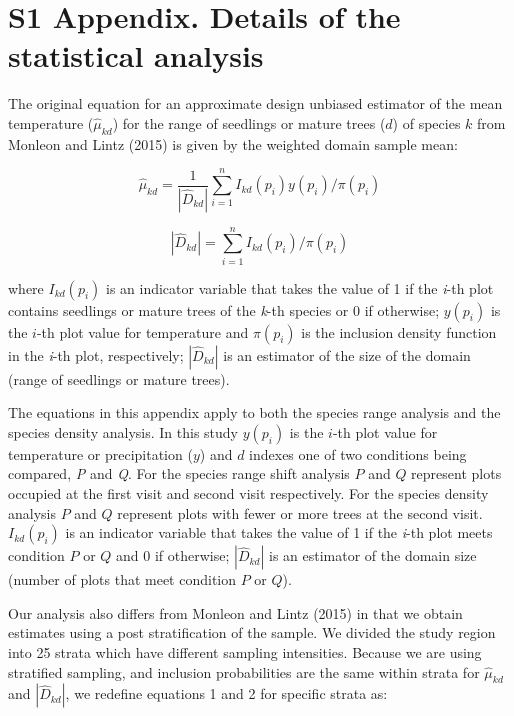 \documentclass[12pt]{article}
\begin{document}
\pagestyle{plain}

\section*{S1 Appendix.  Details of the statistical analysis}

The original equation for an approximate design unbiased estimator of the mean temperature ($\hat{\mu}_{kd}$) for the range of seedlings or mature trees ($d$) of species $k$ from Monleon and Lintz (2015) is given by the weighted domain sample mean:

\begin{equation}
\hat{\mu}_{kd} = \frac{1}{|\hat{D}_{kd}|}\displaystyle\sum_{i=1}^{n} I_{kd}(p_i)y(p_i)/\pi(p_i)  
\end{equation} 

\begin{equation}
|\hat{D}_{kd}| = \displaystyle\sum_{i=1}^{n} I_{kd}(p_i)/\pi(p_i)  
\end{equation} 

where $I_{kd}(p_i)$ is an indicator variable that takes the value of 1 if the \emph{i}-th plot contains seedlings or mature trees of the \emph{k}-th species or 0 if otherwise; $y(p_i)$ is the $i$-th plot value for temperature and $\pi(p_i)$ is the inclusion density function in the \emph{i}-th plot, respectively; $|\hat{D}_{kd}|$ is an estimator of the size of the domain (range of seedlings or mature trees).

The equations in this appendix apply to both the species range analysis and the species density analysis.  In this study $y(p_i)$ is the $i$-th plot value for temperature or precipitation ($y$) and $d$ indexes one of two conditions being compared, \emph{P} and \emph{Q}.  For the species range shift analysis $P$ and $Q$ represent plots occupied at the first visit and second visit respectively.  For the species density analysis $P$ and $Q$  represent plots with fewer or more trees at the second visit.  $I_{kd}(p_i)$ is an indicator variable that takes the value of 1 if the \emph{i}-th plot meets condition $P$ or $Q$ and 0 if otherwise; $|\hat{D}_{kd}|$ is an estimator of the domain size (number of plots that meet condition $P$ or $Q$).

Our analysis also differs from Monleon and Lintz (2015) in that we obtain estimates using a post stratification of the sample.  We divided the study region into 25 strata which have different sampling intensities.  Because we are using stratified sampling, and inclusion probabilities are the same within strata for $\hat{\mu}_{kd}$ and $|\hat{D}_{kd}|$, we redefine equations 1 and 2 for specific strata as: 
\end{document}
